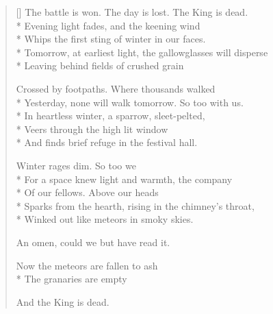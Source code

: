 \label{ch:lear_bo}
\settowidth{\versewidth}{Tomorrow, at earliest light, the gallowglasses will disperse}
\begin{verse}[\versewidth]
 The battle is won. The day is lost. The King is dead.\\*
Evening light fades, and the keening wind\\*
Whips the first sting of winter in our faces.\\*
Tomorrow, at earliest light, the gallowglasses will disperse\\*
Leaving behind fields of crushed grain

Crossed by footpaths.  Where thousands walked\\*
Yesterday, none will walk tomorrow.  So too with us.\\*
In heartless winter, a sparrow, sleet-pelted,\\*
Veers through the high lit window\\*
And finds brief refuge in the festival hall.

Winter rages dim.  So too we\\*
For a space knew light and warmth, the company\\*
Of our fellows.  Above our heads\\*
Sparks from the hearth, rising in the chimney's throat,\\*
Winked out like meteors in smoky skies.

An omen, could we but have read it.

Now the meteors are fallen to ash\\*
The granaries are empty

And the King is dead.
\end{verse}
